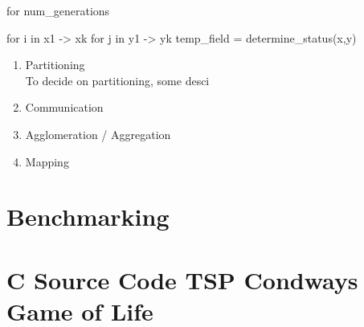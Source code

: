 \documentclass[a4paper,11pt,twoside]{article}
\begin{document}
for num_generations {
  for i in x1 -> xk {
    for j in y1 -> yk {
      temp_field = determine_status(x,y)
    }
  }
  

}


  


\begin{enumerate}
\item Partitioning\\
To decide on partitioning, some desci


\item Communication
\item Agglomeration / Aggregation
\item Mapping
\end{enumerate}


\section{Benchmarking}





\appendix
\section{C Source Code TSP Condways Game of Life}{\label{app:gol}}
\end{document}
